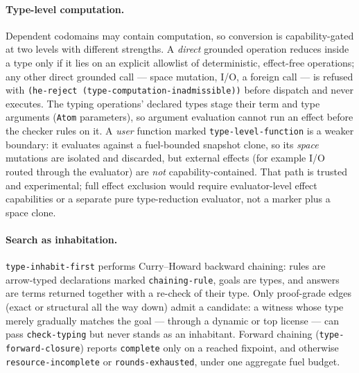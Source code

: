 \documentclass[11pt]{article}
\newcommand{\code}[1]{\texttt{#1}}
\begin{document}
\paragraph{Type-level computation.}  Dependent codomains may contain
computation, so conversion is capability-gated at two levels with
different strengths.  A \emph{direct} grounded operation reduces inside
a type only if it lies on an explicit allowlist of deterministic,
effect-free operations; any other direct grounded call --- space
mutation, I/O, a foreign call --- is refused with
\code{(he-reject (type-computation-inadmissible))} before dispatch and
never executes.  The typing operations' declared types stage their term
and type arguments (\code{Atom} parameters), so argument evaluation
cannot run an effect before the checker rules on it.  A \emph{user}
function marked \code{type-level-function} is a weaker boundary: it
evaluates against a fuel-bounded snapshot clone, so its \emph{space}
mutations are isolated and discarded, but external effects (for
example I/O routed through the evaluator) are \emph{not}
capability-contained.  That path is trusted and experimental; full
effect exclusion would require evaluator-level effect capabilities or a
separate pure type-reduction evaluator, not a marker plus a space
clone.

\paragraph{Search as inhabitation.}  \code{type-inhabit-first}
performs Curry--Howard backward chaining: rules are arrow-typed
declarations marked \code{chaining-rule}, goals are types, and answers
are terms returned together with a re-check of their type.  Only
proof-grade edges (exact or structural all the way down) admit a
candidate: a witness whose type merely gradually matches the goal ---
through a dynamic or top license --- can pass \code{check-typing} but
never stands as an inhabitant.  Forward chaining
(\code{type-forward-closure}) reports \code{complete} only on a
reached fixpoint, and otherwise \code{resource-incomplete} or
\code{rounds-exhausted}, under one aggregate fuel budget.
\end{document}
